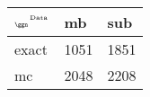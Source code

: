 \begin{tabular}{lll}
    \toprule
    $_{\text{\tiny{\ggn}}}$$^{\text{\tiny{Data}}}$ & mb & sub \\
    \midrule
    exact & 1051
              & 1851 \\
    mc   & 2048
              & 2208 \\
    \bottomrule
\end{tabular}
